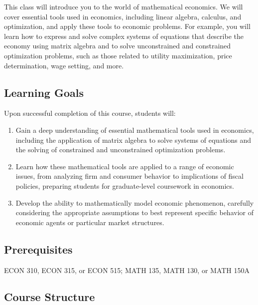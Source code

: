 \documentclass{./../Latex/syllabus}
\begin{document}
This class will introduce you to the world of mathematical economics. We will cover essential tools used in economics, including linear algebra, calculus, and optimization, and apply these tools to economic problems.  For example, you will learn how to express and solve complex systems of equations that describe the economy using matrix algebra and to solve unconstrained and constrained optimization problems, such as those related to utility maximization, price determination, wage setting, and more.


\subsection*{Learning Goals}
Upon successful completion of this course, students will:
\begin{enumerate}
\itemsep0em 
  \item Gain a deep understanding of essential mathematical tools used in economics, including the application of matrix algebra to solve systems of equations and the solving of constrained and unconstrained optimization problems.
  \item Learn how these mathematical tools are applied to a range of economic issues, from analyzing firm and consumer behavior to implications of fiscal policies, preparing students for graduate-level coursework in economics.
  \item Develop the ability to mathematically model economic phenomenon, carefully considering the appropriate assumptions to best represent specific behavior of economic agents or particular market structures.
\end{enumerate}

\newpage
\subsection*{Prerequisites}
ECON 310, ECON 315, or ECON 515; MATH 135, MATH 130, or MATH 150A

\subsection*{Course Structure}
\end{document}
